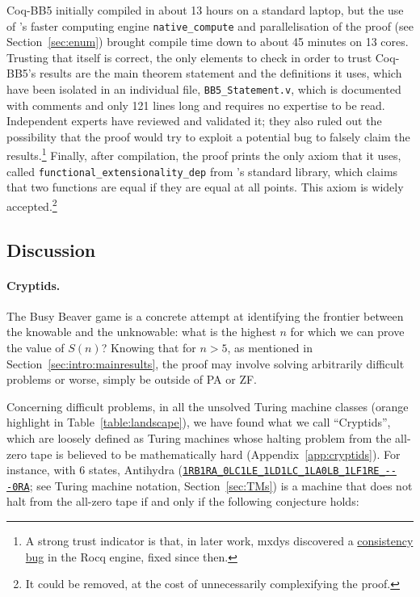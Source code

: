 \documentclass[a4paper,british]{article}
\theoremstyle{definition} %
\numberwithin{equation}{section}
\theoremstyle{definition} %
\newcommand{\tm}[1]{\href{https://bbchallenge.org/#1}{\texttt{\nolinkurl{#1}}}}
\newcommand{\CoqBB}{Coq-BB5\xspace}
\begin{document}
\CoqBB initially compiled in about 13 hours on a standard laptop, but the use of \Coq's faster computing engine \texttt{native\_compute} \cite{nativecompute} and parallelisation of the proof (see Section~\ref{sec:enum}) brought compile time down to about 45 minutes on 13 cores. Trusting that \Coq itself is correct, the only elements to check in order to trust \CoqBB's results are the main theorem statement and the definitions it uses, which have been isolated in an individual file, \texttt{BB5\_Statement.v}, which is documented with comments and only 121 lines long and requires no \Coq expertise to be read. Independent \Coq experts have reviewed and validated it; they also ruled out the possibility that the proof would try to exploit a potential \Coq bug to falsely claim the results.\footnote{A strong trust indicator is that, in later work, mxdys discovered a \href{https://github.com/rocq-prover/rocq/issues/20413}{consistency bug} in the Rocq engine, fixed since then.} Finally, after compilation, the proof prints the only axiom that it uses, called \texttt{functional\_extensionality\_dep} from \Coq's standard library, which claims that two functions are equal if they are equal at all points. This axiom is widely accepted.\footnote{It could be removed, at the cost of unnecessarily complexifying the proof.}

\vspace{-1em}
\subsection{Discussion}\label{sec:intro:discuss}

\paragraph{Cryptids.} The Busy Beaver game is a concrete attempt at identifying the frontier between the knowable and the unknowable: what is the highest $n$ for which we can prove the value of $S(n)$? Knowing that for $n > 5$, as mentioned in Section~\ref{sec:intro:mainresults}, the proof may involve solving arbitrarily difficult problems or worse, simply be outside of PA or ZF.


Concerning difficult problems, in all the unsolved Turing machine classes (orange highlight in Table~\ref{table:landscape}), we have found what we call ``Cryptids'', which are loosely defined as Turing machines whose halting problem from the all-zero tape is believed to be mathematically hard (Appendix~\ref{app:cryptids}). For instance, with 6 states, Antihydra (\tm{1RB1RA_0LC1LE_1LD1LC_1LA0LB_1LF1RE_---0RA}; see Turing machine notation, Section~\ref{sec:TMs}) is a machine that does not halt from the all-zero tape if and only if the following conjecture holds:
\end{document}
